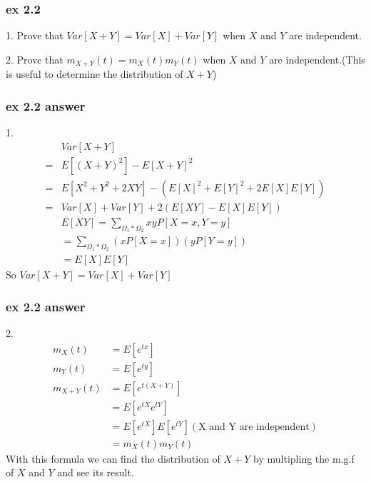 \documentclass{beamer}
\begin{document}
\begin{frame}
    \frametitle{ex 2.2}
    1. Prove that $Var[X+Y]=Var[X]+Var[Y]$ when $X$ and $Y$ are independent.\par
    2. Prove that $m_{X+Y}(t)=m_{X}(t)m_{Y}(t)$ when $X$ and $Y$ are independent.(This is useful to determine the distribution of $X+Y$)\par

\end{frame}

\begin{frame}
    \frametitle{ex 2.2 answer}
    1. 
    \begin{align*}
        & Var[X+Y]\\
        =& E[(X+Y)^2]-E[X+Y]^2\\
        =& E[X^2+Y^2+2XY]-(E[X]^2+E[Y]^2+2E[X]E[Y])\\
        =& Var[X]+Var[Y]+2(E[XY]-E[X]E[Y])\\
        & E[XY] =\sum\limits_{\Omega_1*\Omega_2}xyP[X=x, Y=y]\\
        &=\sum\limits_{\Omega_1*\Omega_2}(x P[X=x])(y P[Y=y])\\
        &=E[X]E[Y]
    \end{align*}
    So $Var[X+Y]=Var[X]+Var[Y]$


\end{frame}

\begin{frame}
    \frametitle{ex 2.2 answer}
    2. 
    \begin{align*}
        m_X(t)& =E[e^{tx}]\\
        m_Y(t)& =E[e^{ty}]\\
        m_{X+Y}(t)& =E[e^{t(X+Y)}]\\
        & =E[e^{tX}e^{tY}]\\
        & =E[e^{tX}]E[e^{tY}](\text{X and Y are independent})\\
        & =m_{X}(t)m_{Y}(t)
    \end{align*}
    With this formula we can find the distribution of $X+Y$ by multipling the m.g.f of $X$ and $Y$ and see its result.
\end{frame}
\end{document}
